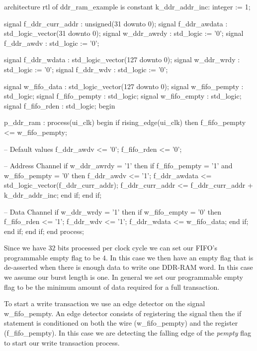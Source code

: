 \begin{VHDLlisting}[tabsize=4]
architecture rtl of ddr_ram_example is
    constant k_ddr_addr_inc: integer := 1;
    
    signal f_ddr_curr_addr : unsigned(31 downto 0);
    signal f_ddr_awdata    : std_logic_vector(31 downto 0);
    signal w_ddr_awrdy     : std_logic := '0';
    signal f_ddr_awdv      : std_logic := '0';
    
    signal f_ddr_wdata     : std_logic_vector(127 downto 0);
    signal w_ddr_wrdy      : std_logic := '0';
    signal f_ddr_wdv       : std_logic := '0';
    
    signal w_fifo_data     : std_logic_vector(127 downto 0); 
    signal w_fifo_pempty   : std_logic;
    signal f_fifo_pempty   : std_logic;
    signal w_fifo_empty    : std_logic;
    signal f_fifo_rden     : std_logic;	
begin

p_ddr_ram : process(ui_clk)
begin
    if rising_edge(ui_clk) then
        f_fifo_pempty <= w_fifo_pempty;
        
        -- Default values
        f_ddr_awdv <= '0';
        f_fifo_rden <= '0';
        
        -- Address Channel
        if w_ddr_awrdy = '1' then
            if f_fifo_pempty = '1' and w_fifo_pempty = '0' then
                f_ddr_awdv <= '1';
                f_ddr_awdata <= std_logic_vector(f_ddr_curr_addr);
                f_ddr_curr_addr <= f_ddr_curr_addr + k_ddr_addr_inc;
            end if;		
        end if;
        
        -- Data Channel
        if w_ddr_wrdy = '1' then
            if w_fifo_empty = '0' then
                f_fifo_rden <= '1';
                f_ddr_wdv <= '1';
                f_ddr_wdata <= w_fifo_data;
            end if;			
        end if;
    end if;
end process;
\end{VHDLlisting}

Since we have $32$ bits processed per clock cycle we can set our \ac{FIFO}'s programmable empty flag to be $4$. In this case we then have an empty flag that is de-asserted when there is enough data to write one \ac{DDR}-\ac{RAM} word. In this case we assume our burst length is one. In general we set our programmable empty flag to be the minimum amount of data required for a full transaction. 

To start a write transaction we use an edge detector on the signal w\_fifo\_pempty. An edge detector consists of registering the signal then the if statement is conditioned on both the wire (w\_fifo\_pempty) and the register (f\_fifo\_pempty). In this case we are detecting the falling edge of the \emph{pempty} flag to start our write transaction process.

